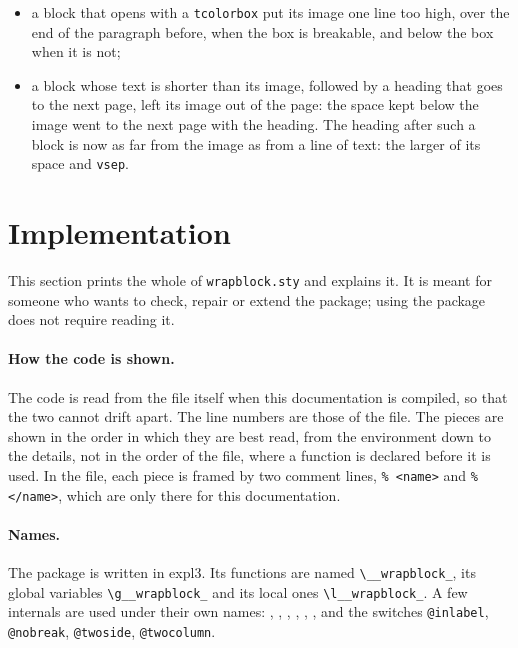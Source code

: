 \documentclass[a4paper,11pt]{article}
\newcommand\pkg[1]{\textsf{#1}}
\newcommand\key[1]{\texttt{#1}}
\providecommand\env[1]{\texttt{#1}}
\newcommand\fn[1]{\mbox{\texttt{\textbackslash\_\_wrapblock\_}}\csurl{#1}}
\newcommand\gv[1]{\mbox{\texttt{\textbackslash g\_\_wrapblock\_}}\csurl{#1}}
\newcommand\lv[1]{\mbox{\texttt{\textbackslash l\_\_wrapblock\_}}\csurl{#1}}
\begin{document}
\begin{description}
\begin{itemize}
  \item a block that opens with a \env{tcolorbox} put its image one line too high, over the end of the paragraph before, when the box is breakable, and below the box when it is not;
  \item a block whose text is shorter than its image, followed by a heading that goes to the next page, left its image out of the page: the space kept below the image went to the next page with the heading. The heading after such a block is now as far from the image as from a line of text: the larger of its space and \key{vsep}.
  \end{itemize}
\end{description}

\clearpage
\section{Implementation}\label{sec:impl}
\setlength{\emergencystretch}{3em}

This section prints the whole of \texttt{wrapblock.sty} and explains it. It is meant for someone who wants to check, repair or extend the package; using the package does not require reading it.

\paragraph{How the code is shown.} The code is read from the file itself when this documentation is compiled, so that the two cannot drift apart. The line numbers are those of the file. The pieces are shown in the order in which they are best read, from the environment down to the details, not in the order of the file, where a function is declared before it is used. In the file, each piece is framed by two comment lines, \verb|% <name>| and \verb|% </name>|, which are only there for this documentation.

\paragraph{Names.} The package is written in \pkg{expl3}. Its functions are named \fn{...}, its global variables \gv{...} and its local ones \lv{...}. A few \LaTeXe{} internals are used under their own names: , , , , , , and the switches \texttt{@inlabel}, \texttt{@nobreak}, \texttt{@twoside}, \texttt{@twocolumn}.
\end{document}
